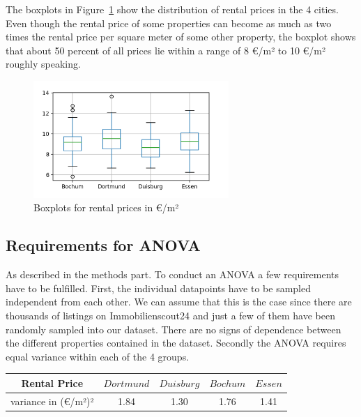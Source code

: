\documentclass[12 pt]{scrartcl}
\begin{document}
The boxplots in Figure~\ref{fig:boxplots} show the distribution of rental prices in the 4 cities. Even though the rental price of some properties can become as much as two times the rental price per square meter of some other property, the boxplot shows that about 50 percent of all prices lie within a range of 8 €/m² to 10 €/m² roughly speaking.

\begin{figure}[htb]
  \centering
  \includegraphics[width=0.66\textwidth]{./images/boxplot}
  \caption{Boxplots for rental prices in €/m²}
  \label{fig:boxplots}
\end{figure}

\subsection{Requirements for ANOVA}

As described in the methods part. To conduct an ANOVA a few requirements have to be fulfilled. First, the individual datapoints have to be sampled independent from each other. We can assume that this is the case since there are thousands of listings on Immobilienscout24 and just a few of them have been randomly sampled into our dataset. There are no signs of dependence between the different properties contained in the dataset.
Secondly the ANOVA requires equal variance within each of the 4 groups.

\begin{table}[ht]
  \centering
  \label{tab:variances}
  \begin{tabular}{c|cccc}
    Rental Price        & $Dortmund$ & $Duisburg$ & $Bochum$ & $Essen$ \\
    \hline
    variance in (€/m²)² & 1.84       & 1.30       & 1.76     & 1.41    \\
  \end{tabular}
\end{table}
\end{document}
